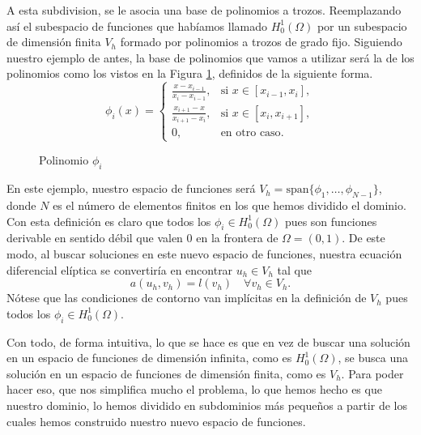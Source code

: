 \documentclass[a4paper,11pt,spanish, twoside, leqno]{tfg-uam}
\theoremstyle{definition}
\begin{document}
A esta subdivision, se le asocia una base de polinomios a trozos. Reemplazando así el subespacio de funciones que habíamos llamado $H_0^1(\Omega)$ por un subespacio de dimensión finita $V_h$ formado por polinomios a trozos  de grado fijo. Siguiendo nuestro ejemplo de antes, la base de polinomios que vamos a utilizar será la de los polinomios como los vistos en la Figura \ref{fig:BasePolinomios}, definidos de la siguiente forma.
\begin{equation*}
    \phi_i(x) = \begin{cases}
        \frac{x-x_{i-1}}{x_i-x_{i-1}}, & \text{si } x\in[x_{i-1},x_i],\\
        \frac{x_{i+1}-x}{x_{i+1}-x_i}, & \text{si } x\in[x_i,x_{i+1}],\\
        0, & \text{en otro caso}.
    \end{cases} 
\end{equation*}

\begin{figure}
    \centering
    \caption{Polinomio $\phi_i$}
    \label{fig:BasePolinomios}
\end{figure}

En este ejemplo, nuestro espacio de funciones será $V_h = \text{span}\{\phi_1,\dots,\phi_{N-1}\}$, donde $N$ es el número de elementos finitos en los que hemos dividido el dominio. Con esta definición es claro que todos los $\phi_i\in H_0^1(\Omega)$ pues son funciones derivable en sentido débil que valen $0$ en la frontera de $\Omega =(0,1)$. De este modo, al buscar soluciones en este nuevo espacio de funciones, nuestra ecuación diferencial elíptica se convertiría en encontrar $u_h\in V_h$ tal que
\begin{equation*}
    a(u_h,v_h) = l(v_h) \quad \forall v_h\in V_h.
\end{equation*}
Nótese que las condiciones de contorno van implícitas en la definición de $V_h$ pues todos los $\phi_i\in H_0^1(\Omega)$. 

Con todo, de forma intuitiva, lo que se hace es que en vez de buscar una solución en un espacio de funciones de dimensión infinita, como es $H_0^1(\Omega)$, se busca una solución en un espacio de funciones de dimensión finita, como es $V_h$. Para poder hacer eso, que nos simplifica mucho el problema, lo que hemos hecho es que nuestro dominio, lo hemos dividido en subdominios más pequeños a partir de los cuales hemos construido nuestro nuevo espacio de funciones. 
\end{document}
